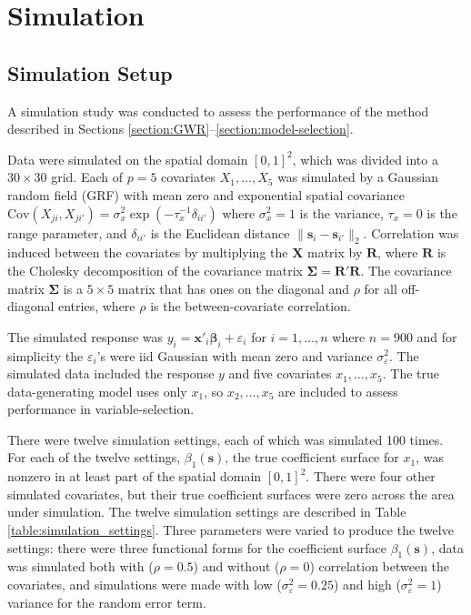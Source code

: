 \documentclass[authoryear, review, 11pt]{elsarticle}
\begin{document}
\section{Simulation \label{sec:simulation}}
	\subsection{Simulation Setup}
	A simulation study was conducted to assess the performance of the method described in Sections \ref{section:GWR}--\ref{section:model-selection}. 
	
	Data were simulated on the spatial domain $[0,1]^2$, which was divided into a $30 \times 30$ grid. Each of $p=5$ covariates $X_1, \dots, X_5$ was simulated by a Gaussian random field (GRF) with mean zero and exponential spatial covariance $\text{Cov} \left(X_{ji}, X_{ji'} \right) = \sigma_x^2 \exp{\left( -\tau_x^{-1} \delta_{ii'} \right)}$ where $\sigma_x^2=1$ is the variance, $\tau_x = 0$ is the range parameter, and $\delta_{ii'}$ is the Euclidean distance $\|\bm{s}_i - \bm{s}_{i'}\|_2$. Correlation was induced between the covariates by multiplying the $\bm{X}$ matrix by $\bm{R}$, where $\bm{R}$ is the Cholesky decomposition of the covariance matrix $\bm{\Sigma} = \bm{R}'\bm{R}$. The covariance matrix $\bm{\Sigma}$ is a $5 \times 5$ matrix that has ones on the diagonal and $\rho$ for all off-diagonal entries, where $\rho$ is the between-covariate correlation.
		
	The simulated response was $y_i = \bm{x}'_i \bm{\beta}_i + \varepsilon_i$ for $i=1, \dots, n$ where $n=900$ and for simplicity the $\varepsilon_i$'s were iid Gaussian with mean zero and variance $\sigma_\varepsilon^2$. The simulated data included the response $y$ and five covariates $x_1, \dots, x_5$. The true data-generating model uses only $x_1$, so $x_2, \dots, x_5$ are included to assess performance in variable-selection.
	
	There were twelve simulation settings, each of which was simulated 100 times. For each of the twelve settings, $\beta_1(\bm{s})$, the true coefficient surface for $x_1$, was nonzero in at least part of the spatial domain $[0,1]^2$. There were four other simulated covariates, but their true coefficient surfaces were zero across the area under simulation. The twelve simulation settings are described in Table \ref{table:simulation_settings}. Three parameters were varied to produce the twelve settings: there were three functional forms for the coefficient surface $\beta_1(\bm{s})$, data was simulated both with ($\rho = 0.5$) and without ($\rho = 0$) correlation between the covariates, and simulations were made with low ($\sigma_\varepsilon^2 = 0.25$) and high ($\sigma_\varepsilon^2 = 1$) variance for the random error term.
	
\end{document}
